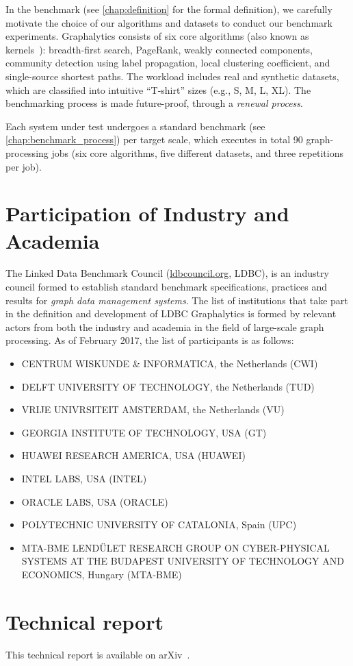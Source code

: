 In the benchmark (see \cref{chap:definition} for the formal definition), we carefully motivate the choice of our algorithms and datasets to conduct our benchmark experiments. Graphalytics consists of six core algorithms (also known as kernels~\cite{DBLP:conf/hipc/BaderM05}): breadth-first search, PageRank, weakly connected components, community detection using label propagation, local clustering coefficient, and single-source shortest paths. The workload includes real and synthetic datasets, which are classified into intuitive ``T-shirt'' sizes (e.g., S, M, L, XL). The benchmarking process is made future-proof, through a {\it renewal process}. 

Each system under test undergoes a standard benchmark (see \cref{chap:benchmark_process}) per target scale, which executes in total 90 graph-processing jobs (six core algorithms, five different datasets, and three repetitions per job).


\section{Participation of Industry and Academia}
The Linked Data Benchmark Council (\url{ldbcouncil.org}, LDBC), is an industry council formed to 
establish standard benchmark specifications, practices and results for {\em graph data management systems}. The list of institutions that take part in the definition and development of LDBC Graphalytics is formed by relevant actors from both the industry and academia in the field of large-scale graph processing. As of February 2017, the list of participants is as follows:

\begin{itemize}
	\item \MakeUppercase{Centrum Wiskunde \& Informatica}, the Netherlands (CWI)
	\item \MakeUppercase{Delft University of Technology}, the Netherlands (TUD)
	\item \MakeUppercase{Vrije Univrsiteit Amsterdam}, the Netherlands (VU)
	\item \MakeUppercase{Georgia Institute of Technology}, USA (GT)
	\item \MakeUppercase{Huawei Research America}, USA (HUAWEI)
	\item \MakeUppercase{Intel Labs}, USA (INTEL)
	\item \MakeUppercase{Oracle Labs}, USA (ORACLE)
	\item \MakeUppercase{Polytechnic University of Catalonia}, Spain (UPC)
	\item \MakeUppercase{MTA-BME Lend\"ulet Research Group on Cyber-Physical Systems at the Budapest University of Technology and Economics}, Hungary (MTA-BME)
\end{itemize}

\section{Technical report}

This technical report is available on arXiv~\cite{DBLP:journals/corr/abs-2011-15028}.
